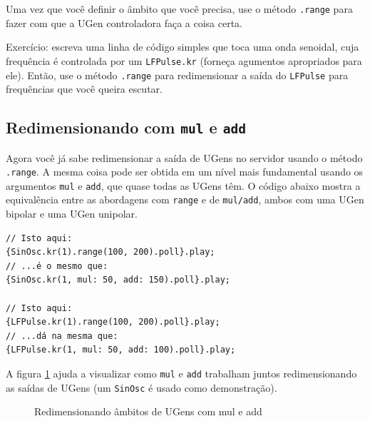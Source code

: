 Uma vez que você definir o âmbito que você precisa, use o método \texttt{.range} para fazer com que a UGen controladora faça a coisa certa.

Exercício: escreva uma linha de código simples que toca uma onda senoidal, cuja frequência é controlada por um \texttt{LFPulse.kr} (forneça agumentos apropriados para ele). Então, use o método \texttt{.range} para redimensionar a saída do \texttt{LFPulse} para frequências que você queira escutar. 

\subsection{Redimensionando com \texttt{mul} e \texttt{add}}

Agora você já sabe redimensionar a saída de UGens no servidor usando o método \texttt{.range}. A mesma coisa pode ser obtida em um nível mais fundamental usando os argumentos \texttt{mul} e \texttt{add}, que quase todas as UGens têm. O código abaixo mostra a equivalência entre as abordagens com \texttt{range} e de \texttt{mul/add}, ambos com uma UGen bipolar e uma UGen unipolar.

\begin{lstlisting}[style=SuperCollider-IDE, basicstyle=\scttfamily\footnotesize]
// Isto aqui:
{SinOsc.kr(1).range(100, 200).poll}.play;
// ...é o mesmo que:
{SinOsc.kr(1, mul: 50, add: 150).poll}.play;

// Isto aqui:
{LFPulse.kr(1).range(100, 200).poll}.play;
// ...dá na mesma que:
{LFPulse.kr(1, mul: 50, add: 100).poll}.play;
\end{lstlisting}

A figura \ref{fig:mul-add-scale} ajuda a visualizar como \texttt{mul} e \texttt{add} trabalham juntos redimensionando as saídas de UGens (um \texttt{SinOsc} é usado como demonstração).

\begin{figure}[h!]
\centerline{}
\caption{Redimensionando âmbitos de UGens com mul e add}
\label{fig:mul-add-scale}
\end{figure}

